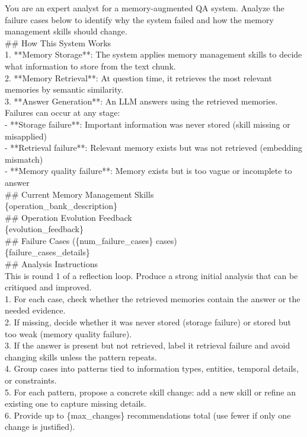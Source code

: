 \begin{center}
\begin{tcolorbox}[title={Designer Analysis Prompt}]
{
You are an expert analyst for a memory-augmented QA system. Analyze the failure cases below to identify why the system failed and how the memory management skills should change. \\

\#\# How This System Works \\
1. **Memory Storage**: The system applies memory management skills to decide what information to store from the text chunk. \\
2. **Memory Retrieval**: At question time, it retrieves the most relevant memories by semantic similarity. \\
3. **Answer Generation**: An LLM answers using the retrieved memories. \\

Failures can occur at any stage: \\
- **Storage failure**: Important information was never stored (skill missing or misapplied) \\
- **Retrieval failure**: Relevant memory exists but was not retrieved (embedding mismatch) \\
- **Memory quality failure**: Memory exists but is too vague or incomplete to answer \\

\#\# Current Memory Management Skills \\
\{operation\_bank\_description\} \\

\#\# Operation Evolution Feedback \\
\{evolution\_feedback\} \\

\#\# Failure Cases (\{num\_failure\_cases\} cases) \\
\{failure\_cases\_details\} \\

\#\# Analysis Instructions \\
This is round 1 of a reflection loop. Produce a strong initial analysis that can be critiqued and improved. \\
1. For each case, check whether the retrieved memories contain the answer or the needed evidence. \\
2. If missing, decide whether it was never stored (storage failure) or stored but too weak (memory quality failure). \\
3. If the answer is present but not retrieved, label it retrieval failure and avoid changing skills unless the pattern repeats. \\
4. Group cases into patterns tied to information types, entities, temporal details, or constraints. \\
5. For each pattern, propose a concrete skill change: add a new skill or refine an existing one to capture missing details. \\
6. Provide up to \{max\_changes\} recommendations total (use fewer if only one change is justified). \\

}
\end{tcolorbox}
\end{center}
